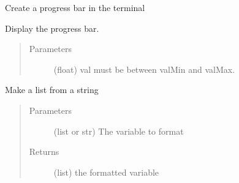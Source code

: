 \documentclass[a4paper,10pt,english]{sphinxmanual}
\begin{document}

\begin{fulllineitems}
\label{\detokenize{apidoc_commands/commands:commands.find_duplicates.Progress_bar}}
Create a progress bar in the terminal

\begin{fulllineitems}
\label{\detokenize{apidoc_commands/commands:commands.find_duplicates.Progress_bar.display_value_progression}}
Display the progress bar.
\begin{quote}\begin{description}
\item[{Parameters}] \leavevmode
{} \textendash{} (float) val must be between valMin and valMax.

\end{description}\end{quote}

\end{fulllineitems}


\end{fulllineitems}


\begin{fulllineitems}
\label{\detokenize{apidoc_commands/commands:commands.find_duplicates.format_list_of_str}}
Make a list from a string
\begin{quote}\begin{description}
\item[{Parameters}] \leavevmode
{} \textendash{} (list or str) The variable to format

\item[{Returns}] \leavevmode
(list) the formatted variable

\end{description}\end{quote}

\end{fulllineitems}
\end{document}
